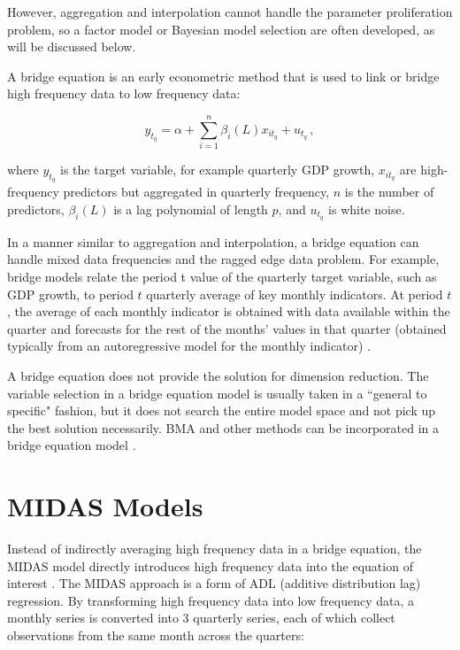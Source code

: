 However, aggregation and interpolation cannot handle the parameter proliferation problem, so a factor model or Bayesian model selection are often developed, as will be discussed below.  


A bridge equation is an early econometric method that is used to link or bridge high frequency data to low frequency data: 

$$y_{t_q} = \alpha + \sum_{i=1}^{n} \beta_i (L) x_{it_q} + u_{t_q} \, ,$$

where $y_{t_q}$ is the target variable, for example quarterly GDP growth, $x_{it_q}$ are high-frequency predictors but aggregated in quarterly frequency,  $n$ is the number of predictors, $\beta_i(L)$ is a lag polynomial of length $p$, and $u_{t_q}$ is white noise. 

In a manner similar to aggregation and interpolation, a bridge equation can handle mixed data frequencies and the ragged edge data problem. For example, bridge models relate the period t value of the quarterly target variable, such as GDP growth, to period $t$ quarterly average of key monthly indicators. At period $t$, the average of each monthly indicator is obtained with data available within the quarter and forecasts for the rest of the  months' values in that quarter (obtained typically from an autoregressive model for the monthly indicator) \cite{Ghysels2004}.

A bridge equation does not provide the solution for dimension reduction. The variable selection in a bridge equation model is usually taken in a ``general to specific" fashion, but it does not search the entire model space and not pick up the best solution necessarily. BMA and other methods can be  incorporated in a bridge equation model  \cite{Bencivelli}.  




\section{MIDAS Models}   

Instead of indirectly averaging high frequency data in a bridge equation, the MIDAS model directly introduces high frequency data into the equation of interest \cite{Ghysels2004} . The MIDAS approach is a form of ADL (additive distribution lag) regression. By transforming high frequency data into low frequency data, a monthly series is converted into 3 quarterly series, each of which collect observations from the same month across the quarters: 


